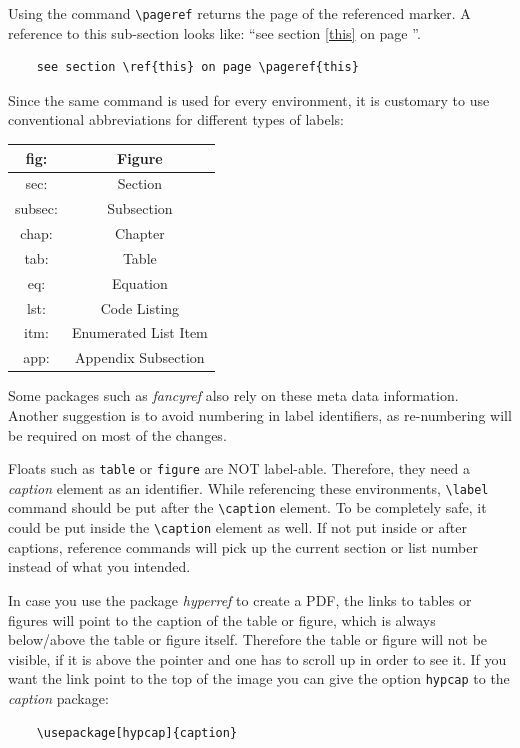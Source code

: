 \documentclass[10pt, a4paper]{article}
\begin{document}
Using the command \texttt{\textbackslash pageref} returns the page of the referenced marker. 
A reference to this sub-section\label{this} looks like: ``see section \ref{this} on page \pageref{this}''.
\begin{verbatim}
	see section \ref{this} on page \pageref{this}
\end{verbatim}

Since the same command is used for every environment, it is customary to use conventional abbreviations for different types of labels:
\begin{table}[htbp]
	\centering
	\begin{tabular}{|c|c|}
	\hline fig: & Figure \\ 
	\hline sec: & Section \\ 
	\hline subsec: & Subsection \\ 
	\hline chap: & Chapter \\ 
	\hline tab: & Table \\ 
	\hline eq: & Equation \\ 
	\hline lst: & Code Listing \\ 
	\hline itm: & Enumerated List Item \\ 
	\hline app: & Appendix Subsection \\ 
	\hline 
\end{tabular} 
\end{table}

Some packages such as \textsl{fancyref} also rely on these meta data information. Another suggestion is to avoid numbering in label identifiers, as re-numbering will be required on most of the changes. 

Floats such as \texttt{table} or \texttt{figure} are NOT label-able. Therefore, they need a \textit{caption} element as an identifier. While referencing these environments, \texttt{\textbackslash label} command should be put after the \texttt{\textbackslash caption} element. To be completely safe, it could be put inside the \texttt{\textbackslash caption} element as well. If not put inside or after captions, reference commands will pick up the current section or list number instead of what you intended.

In case you use the package \textsl{hyperref} to create a PDF, the links to tables or figures will point to the caption of the table or figure, which is always below/above the table or figure itself. Therefore the table or figure will not be visible, if it is above the pointer and one has to scroll up in order to see it. If you want the link point to the top of the image you can give the option \texttt{hypcap} to the \textsl{caption} package:
\begin{verbatim}
	\usepackage[hypcap]{caption}
\end{verbatim}
\end{document}
